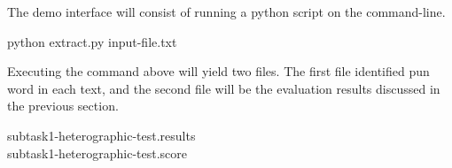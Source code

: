 \documentclass[11pt]{article}
\begin{document}
The demo interface will consist of running a python script on the command-line.\\

\begin{center}
python extract.py input-file.txt\\
\end{center}


\noindent Executing the command above will yield two files.
The first file identified pun word in
each text, and the second file will be the evaluation results discussed in the previous
section.\\

\begin{center}
subtask1-heterographic-test.results\\
subtask1-heterographic-test.score
\end{center}
\end{document}
